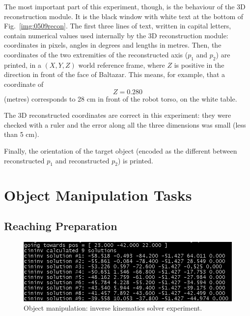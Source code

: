The most important part of this experiment, though, is the behaviour of the 3D reconstruction module. It is the black window with white text at the bottom of Fig.~\ref{img:0509recon}. The first three lines of text, written in capital letters, contain numerical values used internally by the 3D reconstruction module: coordinates in pixels, angles in degrees and lengths in metres. Then, the coordinates of the two extremities of the reconstructed axis ($p_1$ and $p_2$) are printed, in a $(X, Y, Z)$ world reference frame, where $Z$ is positive in the direction in front of the face of Baltazar. This means, for example, that a coordinate of
\[
Z = 0.280
\]
(metres) corresponds to 28 cm in front of the robot torso, on the white table.

The 3D reconstructed coordinates are correct in this experiment: they were checked with a ruler and the error along all the three dimensions was small (less than 5 cm).

Finally, the orientation of the target object (encoded as the different between reconstructed $p_1$ and reconstructed $p_2$) is printed.



%





\section{Object Manipulation Tasks}

\subsection{Reaching Preparation}

\begin{figure}[h]
\centering
\includegraphics[scale=0.5]{figures/10xxcininv}
\caption[Object manipulation: inverse kinematics experiment]{Object manipulation: inverse kinematics solver experiment.}
\label{img:10xxcininv}
\end{figure}

